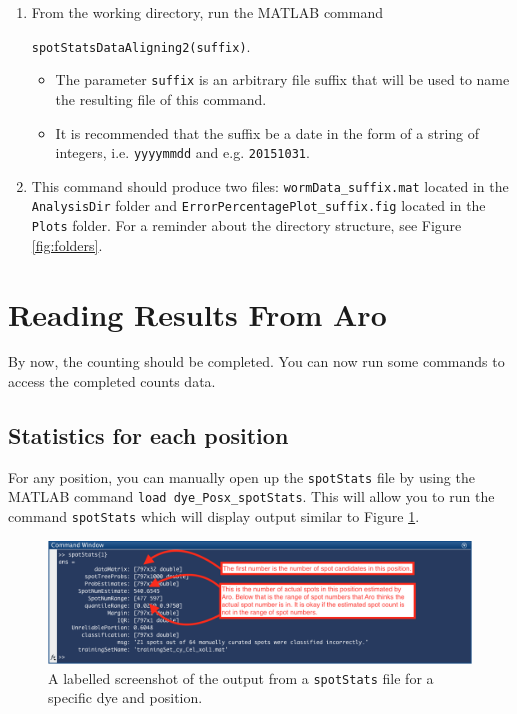 \documentclass[titlepage,11pt]{article}
\begin{document}
\begin{enumerate}
\item From the working directory, run the MATLAB command 

\texttt{spotStatsDataAligning2(suffix)}.
\begin{itemize}
\item The parameter \texttt{suffix} is an arbitrary file suffix that will be used to name the resulting file of this command.
\item It is recommended that the suffix be a date in the form of a string of integers, i.e. \texttt{yyyymmdd} and e.g. \texttt{20151031}.
\end{itemize}
\item This command should produce two files: \texttt{wormData\_suffix.mat} located in the \texttt{AnalysisDir} folder and \texttt{ErrorPercentagePlot\_suffix.fig} located in the \texttt{Plots} folder. For a reminder about the directory structure, see Figure \ref{fig:folders}.
\end{enumerate}

\section{Reading Results From Aro}

By now, the counting should be completed. You can now run some commands to access the completed counts data.\\

\subsection{Statistics for each position}

For any position, you can manually open up the \texttt{spotStats} file by using the MATLAB command \texttt{load dye\_Posx\_spotStats}. This will allow you to run the command \texttt{spotStats} which will display output similar to Figure \ref{fig:spotStatsOutput}.

\begin{figure}
\begin{center}
\includegraphics[scale = 0.45]{spotStatsOutput.png}
\caption{A labelled screenshot of the output from a \texttt{spotStats} file for a specific dye and position.}
\label{fig:spotStatsOutput}
\end{center}
\end{figure}
\end{document}

